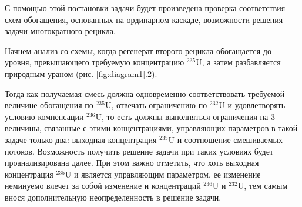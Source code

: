С помощью этой постановки задачи будет произведена проверка соответствия схем обогащения, основанных на ординарном каскаде, возможности решения задачи многократного рецикла.

Начнем анализ со схемы, когда регенерат второго рецикла обогащается до уровня, превышающего требуемую концентрацию $^{235}$U, а затем разбавляется природным ураном (рис. \ref{fig:diagram1}.2).

Тогда как получаемая смесь должна одновременно соответствовать требуемой величине обогащения по $^{235}$U, отвечать ограничению по $^{232}$U и удовлетворять условию компенсации $^{236}$U, то есть должны выполняться ограничения на 3 величины, связанные с этими концентрациями, управляющих параметров в такой задаче только два: выходная концентрация $^{235}$U и соотношение смешиваемых потоков. Возможность получить решение задачи при таких условиях будет проанализирована далее.  При этом важно отметить, что хоть выходная концентрация $^{235}$U и является управляющим параметром, ее изменение неминуемо влечет за собой изменение и концентраций $^{236}$U и $^{232}$U, тем самым внося дополнительную неопределенность в решение задачи.  

